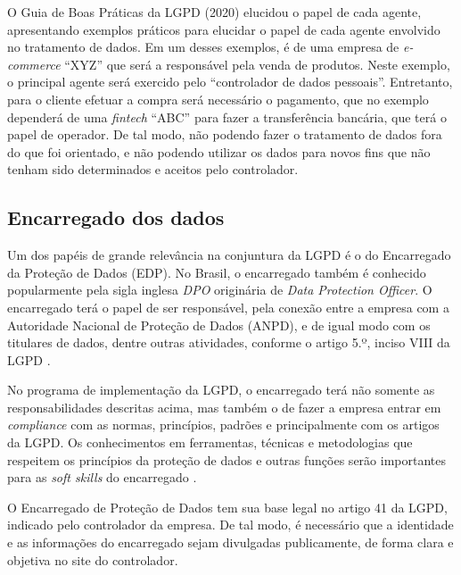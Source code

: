 \documentclass[
	12pt,				%
	openright,			%
	oneside,			%
	a4paper,			%
	english,			%
	french,				%
	spanish,			%
	brazil,				%
	]{abntex2}
\begin{document}
O Guia de Boas Práticas da LGPD (2020) elucidou o papel de cada agente, apresentando exemplos práticos para elucidar o papel de cada agente envolvido no tratamento de dados. Em um desses exemplos, é de uma empresa de \textit{e-commerce} “XYZ” que será a responsável pela venda de produtos. Neste exemplo, o principal agente será exercido pelo “controlador de dados pessoais”. Entretanto, para o cliente efetuar a compra será necessário o pagamento, que no exemplo dependerá de uma \textit{fintech} “ABC” para fazer a transferência bancária, que terá o papel de operador. De tal modo, não podendo fazer o tratamento de dados fora do que foi orientado, e não podendo utilizar os dados para novos fins que não tenham sido determinados e aceitos pelo controlador.



\subsection{Encarregado dos dados}
Um dos papéis de grande relevância na conjuntura da LGPD é o do Encarregado da Proteção de Dados (EDP). No Brasil, o encarregado também é conhecido popularmente pela sigla inglesa \textit{DPO} originária de \textit{Data Protection Officer}. O encarregado terá o papel de ser responsável, pela conexão entre a empresa com a Autoridade Nacional de Proteção de Dados (ANPD), e de igual modo com os titulares de dados, dentre outras atividades, conforme o artigo 5.º, inciso VIII da LGPD \cite{Basan2021}. 

No programa de implementação da LGPD, o encarregado terá não somente as responsabilidades descritas acima, mas também o de fazer a empresa entrar em \textit{compliance} com as normas, princípios, padrões e principalmente com os artigos da LGPD. Os conhecimentos em ferramentas, técnicas e metodologias que respeitem os princípios da proteção de dados e outras funções serão importantes para as \textit{soft skills} do encarregado \cite{Vainzof2020}.

O Encarregado de Proteção de Dados tem sua base legal no artigo 41 da LGPD, indicado pelo controlador da empresa. De tal modo, é necessário que a identidade e as informações do encarregado sejam divulgadas publicamente, de forma clara e objetiva no site do controlador\cite{Bioni2020}. 
\end{document}
